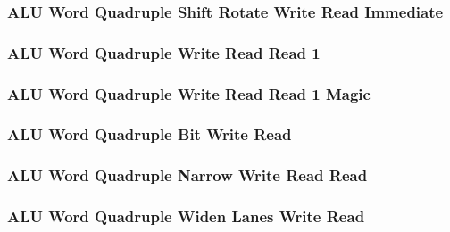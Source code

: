 \subsubsection[{\small ALU Word Quadruple Shift Rotate Write Read Immediate}]{ALU Word Quadruple Shift Rotate Write Read Immediate} \label{sec:format-ALU-WQSWRI}



\subsubsection[{\small ALU Word Quadruple Write Read Read 1}]{ALU Word Quadruple Write Read Read 1} \label{sec:format-ALU-WQWRR1}



\subsubsection[{\small ALU Word Quadruple Write Read Read 1 Magic}]{ALU Word Quadruple Write Read Read 1 Magic} \label{sec:format-ALU-WQWRR1.M}



\subsubsection[{\small ALU Word Quadruple Bit Write Read}]{ALU Word Quadruple Bit Write Read} \label{sec:format-ALU-WQBWR}



\subsubsection[{\small ALU Word Quadruple Narrow Write Read Read}]{ALU Word Quadruple Narrow Write Read Read} \label{sec:format-ALU-WQNWRR}



\subsubsection[{\small ALU Word Quadruple Widen Lanes Write Read}]{ALU Word Quadruple Widen Lanes Write Read} \label{sec:format-ALU-WQWIDEWR}

